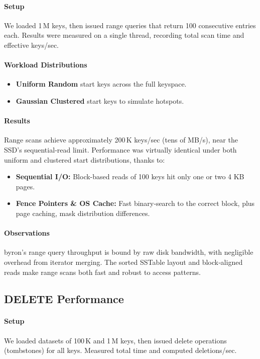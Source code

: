 \documentclass[10pt]{article}
\begin{document}
\paragraph{Setup}
We loaded 1\,M keys, then issued range queries that return 100 consecutive entries each. Results were measured on a single thread, recording total scan time and effective keys/sec.

\paragraph{Workload Distributions}
\begin{itemize}[itemsep=0.5ex]
  \item \textbf{Uniform Random} start keys across the full keyspace.
  \item \textbf{Gaussian Clustered} start keys to simulate hotspots.
\end{itemize}

\paragraph{Results}
Range scans achieve approximately 200\,K keys/sec (tens of MB/s), near the SSD’s sequential‐read limit. Performance was virtually identical under both uniform and clustered start distributions, thanks to:

\begin{itemize}[itemsep=0.5ex]
  \item \textbf{Sequential I/O:} Block-based reads of 100 keys hit only one or two 4 KB pages.
  \item \textbf{Fence Pointers \& OS Cache:} Fast binary‐search to the correct block, plus page caching, mask distribution differences.
\end{itemize}

\paragraph{Observations}
byron’s range query throughput is bound by raw disk bandwidth, with negligible overhead from iterator merging. The sorted SSTable layout and block‐aligned reads make range scans both fast and robust to access patterns.

\subsection{DELETE Performance}

\paragraph{Setup}
We loaded datasets of 100\,K and 1\,M keys, then issued delete operations (tombstones) for all keys. Measured total time and computed deletions/sec.
\end{document}
